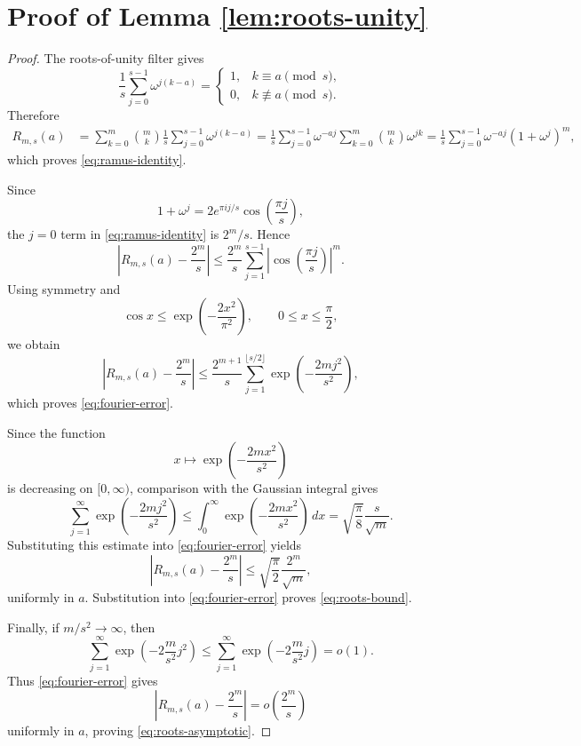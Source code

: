 \documentclass[11pt]{article}
\newcommand{\1}{\mathbf{1}}
\begin{document}
	
	\newpage
	\appendix
	
	\section{Proof of Lemma \ref{lem:roots-unity}}
	
	\begin{proof}
		The roots-of-unity filter gives
		\[
		\frac{1}{s}\sum_{j=0}^{s-1}\omega^{j(k-a)}
		=
		\begin{cases}
			1, & k\equiv a\pmod s,\\
			0, & k\not\equiv a\pmod s.
		\end{cases}
		\]
		Therefore
		\begin{align*}
			R_{m,s}(a)
			&=
			\sum_{k=0}^m
			\binom{m}{k}
			\frac{1}{s}
			\sum_{j=0}^{s-1}\omega^{j(k-a)}
			=
			\frac{1}{s}
			\sum_{j=0}^{s-1}
			\omega^{-aj}
			\sum_{k=0}^m\binom{m}{k}\omega^{jk}
			=
			\frac{1}{s}
			\sum_{j=0}^{s-1}
			\omega^{-aj}(1+\omega^j)^m,
		\end{align*}
		which proves \eqref{eq:ramus-identity}.
		
		Since
		\[
		1+\omega^j
		=
		2e^{\pi i j/s}
		\cos\left(\frac{\pi j}{s}\right),
		\]
		the \(j=0\) term in \eqref{eq:ramus-identity} is \(2^m/s\). Hence
		\[
		\left|
		R_{m,s}(a)-\frac{2^m}{s}
		\right|
		\leq
		\frac{2^m}{s}
		\sum_{j=1}^{s-1}
		\left|
		\cos\left(\frac{\pi j}{s}\right)
		\right|^m.
		\]
		Using symmetry and
		\[
		\cos x
		\leq
		\exp\left(-\frac{2x^2}{\pi^2}\right),
		\qquad
		0\leq x\leq\frac{\pi}{2},
		\]
		we obtain
		\[
		\left|
		R_{m,s}(a)-\frac{2^m}{s}
		\right|
		\leq
		\frac{2^{m+1}}{s}
		\sum_{j=1}^{\lfloor s/2\rfloor}
		\exp\left(-\frac{2mj^2}{s^2}\right),
		\]
		which proves \eqref{eq:fourier-error}.
		
		Since the function
		\[
		x\longmapsto
		\exp\left(-\frac{2mx^2}{s^2}\right)
		\]
		is decreasing on \([0,\infty)\), comparison with the Gaussian integral gives
		\[
		\sum_{j=1}^{\infty}
		\exp\left(-\frac{2mj^2}{s^2}\right)
		\leq
		\int_0^\infty
		\exp\left(-\frac{2mx^2}{s^2}\right)\,dx
		=
		\sqrt{\frac{\pi}{8}}\frac{s}{\sqrt m}.
		\]
		Substituting this estimate into \eqref{eq:fourier-error} yields
		\[
		\left|
		R_{m,s}(a)-\frac{2^m}{s}
		\right|
		\leq
		\sqrt{\frac{\pi}{2}}\frac{2^m}{\sqrt m},
		\]
		uniformly in \(a\).
		Substitution into
		\eqref{eq:fourier-error} proves \eqref{eq:roots-bound}.
		
		Finally, if \(m/s^2\to\infty\), then
		\[
		\sum_{j=1}^{\infty}
		\exp\left(-2\frac{m}{s^2}j^2\right)
		\leq
		\sum_{j=1}^{\infty}
		\exp\left(-2\frac{m}{s^2}j\right)
		=
		o(1).
		\]
		Thus \eqref{eq:fourier-error} gives
		\[
		\left|
		R_{m,s}(a)-\frac{2^m}{s}
		\right|
		=
		o\left(\frac{2^m}{s}\right)
		\]
		uniformly in \(a\), proving \eqref{eq:roots-asymptotic}.
	\end{proof}
\end{document}
